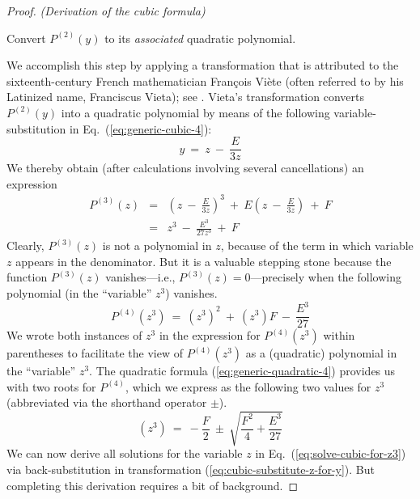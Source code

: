 \begin{proof} {\it (Derivation of the cubic formula)}
\medskip

 Convert $P^{(2)}(y)$ to its {\em associated} quadratic polynomial.


\smallskip

\noindent
We accomplish this step by applying a transformation that is attributed to the sixteenth-century French mathematician Fran\c{c}ois Vi\`{e}te (often referred to by his Latinized name, Franciscus Vieta); see \cite{Hazewinkel}.  Vieta's transformation converts $P^{(2)}(y)$ into a quadratic polynomial by means of the following variable-substitution in Eq.~(\ref{eq:generic-cubic-4}):
\begin{equation}
\label{eq:cubic-substitute-z-for-y}
y \ = \ z \ - \ \frac{E}{3z}
\end{equation}
We thereby obtain (after calculations involving several cancellations) an expression
\begin{eqnarray}
\nonumber
P^{(3)}(z) & = & \left( z \ - \ \frac{E}{3z} \right)^3
\ + \ E \left(z \ - \ \frac{E}{3z} \right) \ + \ F \\
\label{eq:generic-cubic-5}
  & = &
z^3 \ - \ \frac{E^3}{27z^3}  \ + \ F
\end{eqnarray}
Clearly, $P^{(3)}(z)$ is not a polynomial in $z$, because of the term in which variable $z$ appears in the denominator.  But it is a valuable stepping stone because the function $P^{(3)}(z)$ vanishes---i.e., $P^{(3)}(z) = 0$---precisely when the following polynomial (in the ``variable'' $z^3$) vanishes.
\[ P^{(4)}(z^3) \ = \ (z^3)^2 \ + \ (z^3) F \ - \ \frac{E^3}{27} \]
We wrote both instances of $z^3$ in the expression for $P^{(4)}(z^3)$ within parentheses to facilitate the view of $P^{(4)}(z^3)$ as a (quadratic) polynomial in the ``variable'' $z^3$.  The quadratic formula (\ref{eq:generic-quadratic-4}) provides us with two roots for $P^{(4)}$, which we express as the following two values for $z^3$ (abbreviated via the shorthand operator $\pm$).   
\begin{equation}
\label{eq:solve-cubic-for-z3}
(z^3) \ = \
- \frac{F}{2} \ \pm \ \sqrt{\frac{F^2}{4} + \frac{E^3}{27}}
\end{equation}
We can now derive all solutions for the variable $z$ in Eq.~(\ref{eq:solve-cubic-for-z3}) via back-substitution in transformation (\ref{eq:cubic-substitute-z-for-y}).  But completing this derivation requires a bit of background.

\medskip


\end{proof}
